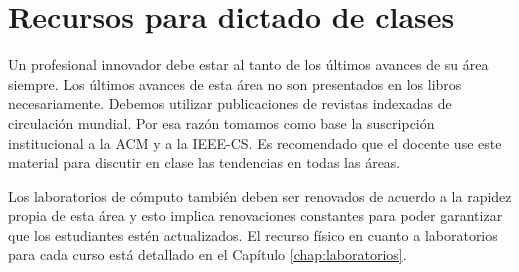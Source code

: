 \section{Recursos para dictado de clases}\label{sec:resources-to-teach}
Un profesional innovador debe estar al tanto de los últimos avances de su área siempre. Los últimos avances de esta área no son presentados en los libros necesariamente. Debemos utilizar publicaciones de revistas indexadas de circulación mundial. Por esa razón tomamos como base la suscripción institucional a la ACM y a la IEEE-CS. Es recomendado que el docente use este material para discutir en clase las tendencias en todas las áreas.

Los laboratorios de cómputo también deben ser renovados de acuerdo a la rapidez
propia de esta área y esto implica renovaciones constantes para poder garantizar
que los estudiantes estén actualizados.
El recurso físico en cuanto a laboratorios para cada curso está detallado en el Capítulo \ref{chap:laboratorios}.
